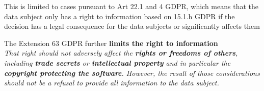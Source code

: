 \documentclass[11pt]{article}
\theoremstyle{definition}
\begin{document}
This is limited to cases pursuant to Art 22.1 and 4 GDPR, which means that the data subject only has a right to information based on 15.1.h GDPR if the decision has a legal consequence for the data subjects or significantly affects them

The Extension 63 GDPR further \textbf{limits the right to information}\\
\emph{That right should not adversely affect the \textbf{rights or freedoms of others}, including \textbf{trade secrets} or \textbf{intellectual property} and in particular the \textbf{copyright protecting the software}. However, the result of those considerations should not be a refusal to provide all information to the data subject.}
\end{document}
